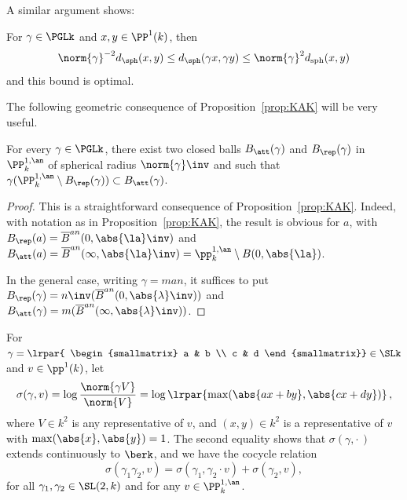 A similar argument shows:

\begin{lemm}\label{lem:lipschitz}
For $\gamma\in \PGLk$ and $x, y\in \PP^1(k)$, then
\[
\norm{\gamma}^{-2} d_{\sph}(x, y)\leq d_{\sph}(\gamma x, \gamma y)\leq
\norm{\gamma}^{2} d_\mathrm{sph}(x, y)
\]
and this bound is optimal.
\end{lemm}

The following geometric consequence of Proposition~\ref{prop:KAK} will be very useful.

\begin{prop}\label{prop:B att rep}
For every $\gamma\in \PGLk$, there exist two closed balls $B_\att(\gamma)$ and $B_\rep(\gamma)$ in $\PP^{1,\an}_k$ of spherical radius $\norm{\gamma}\inv$ and such that $\gamma(\PP^{1,\an}_k\setminus B_\rep(\gamma))\subset B_\att(\gamma)$.
\end{prop}

\begin{proof}
This is a straightforward consequence of Proposition~\ref{prop:KAK}. Indeed, with notation as in Proposition~\ref{prop:KAK}, the result is obvious for $a$, with $B_\rep(a) = \overline{B}^{an}(0, \abs{\la}\inv)$ and $B_\att(a) = \overline{B}^{an}(\infty, \abs{\la}\inv) = \pp^{1,\an}_k\setminus B(0, \abs{\la})$.

In the general case, writing $\gamma =man$, it suffices to put $B_{\rep}(\gamma) = n\inv (\overline{B}^{an}(0, \abs{\lambda}\inv))$ and $B_{\att}(\gamma) = m (\overline{B}^{an}(\infty, \abs{\lambda}\inv))$.
\end{proof}

For $\gamma = \lrpar{
\begin{smallmatrix} a & b \\ c & d
\end{smallmatrix}} \in \SLk$ and $v\in \pp^1(k)$, let
\begin{equation}\label{eq:sigma1}
\sigma(\gamma,v) = \log\frac{\norm{\gamma V}}{\norm{V}} =\log \lrpar{\max (\abs{ax+by}, \abs{cx+dy}) }\,,
\end{equation}
where $V\in k^2$ is any representative of $v$, and $(x,y)\in k^2$ is a representative of $v$ with $\max (\abs{x}, \abs{y})=1$. The second equality shows that $\sigma(\gamma,{\cdot\,})$ extends continuously to $\berk$, and we have the cocycle relation
\begin{equation}\label{eq:cocycle}
\sigma(\gamma_1 \gamma_2,v) = \sigma(\gamma_1, \gamma_2 \cdot v) + \sigma(\gamma_2, v),
\end{equation}
for all $\gamma_1, \gamma_2 \in \SL(2,k)$ and for any $v\in \PP^{1,\an}_k$.


